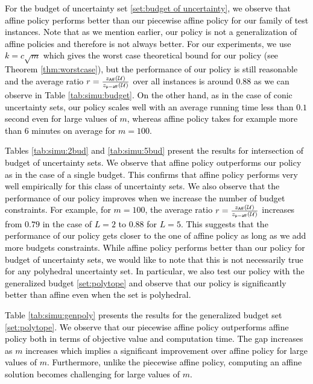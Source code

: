 \documentclass[11pt]{article}
\theoremstyle{plain}
\theoremstyle{definition}
\numberwithin{equation}{section}%
\numberwithin{equation}{section}%
\newcommand*{\red}{\textcolor{black}}
\begin{document}
\red{
For the budget of uncertainty set \eqref{set:budget of uncertainty}, we observe that affine policy performs better than our piecewise affine policy for our family of test instances. Note that as we mention earlier, our policy is not a generalization of affine policies and therefore is not always better. For our experiments, we use $k=c \sqrt{m}$ which gives the worst case theoretical bound for our policy (see Theorem \ref{thm:worstcase}), but the performance of our policy is still reasonable and the average ratio  $r= \frac{z_{\sf{Aff}} ({\cal U})    }{z_{\sf{p-aff}}  ({\cal U})         }$ over all instances is  around 0.88 as we can observe in Table \ref{tab:simu:budget}.  On the other hand, as in the case of conic uncertainty sets, our policy scales well with an average running time less than $0.1$ second even for large values of $m$, whereas affine policy takes for example more than 6 minutes on average for $m=100$. }

\red{
Tables \ref{tab:simu:2bud} and \ref{tab:simu:5bud} present the results for intersection of budget of uncertainty sets. We observe that affine policy outperforms our policy as in the case of a single budget. This confirms that affine policy performs very well empirically for this class of uncertainty sets. We also observe that the performance of our policy improves when we increase the number of budget constraints. For example, for $m=100$, the average ratio $r= \frac{z_{\sf{Aff}} ({\cal U})    }{z_{\sf{p-aff}}  ({\cal U})         }$ increases  from $0.79$ in the case of $L=2$ to $0.88$ for $L=5$. This suggests that the performance of our policy  gets closer to the one of affine policy as long as we add more budgets constraints. While affine policy performs better than our policy for budget of uncertainty sets, we would like to note that this is not necessarily true for any polyhedral uncertainty set. In particular, we also test our policy with the generalized budget \eqref{set:polytope} and observe that our policy is significantly better than affine even when the set is polyhedral.}

\red{
Table \ref{tab:simu:genpoly} presents the results for the generalized budget set \eqref{set:polytope}. We observe that our piecewise affine policy outperforms affine policy both in terms of objective value and computation time. The gap increases as $m$ increases which implies a significant improvement over affine policy for large values of $m$. Furthermore, unlike the piecewise affine policy, computing an affine solution becomes challenging for large values of $m$.}
\end{document}
